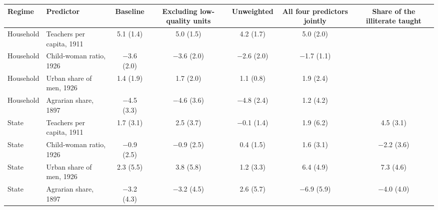 \begin{tabular}{llccccc}
\toprule
Regime & Predictor & Baseline & Excluding low-quality units & Unweighted & All four predictors jointly & Share of the illiterate taught \\
\midrule
Household & Teachers per capita, 1911 & 5.1 (1.4) & 5.0 (1.5) & 4.2 (1.7) & 5.0 (2.0) &  \\
Household & Child-woman ratio, 1926 & $-$3.6 (2.0) & $-$3.6 (2.0) & $-$2.6 (2.0) & $-$1.7 (1.1) &  \\
Household & Urban share of men, 1926 & 1.4 (1.9) & 1.7 (2.0) & 1.1 (0.8) & 1.9 (2.4) &  \\
Household & Agrarian share, 1897 & $-$4.5 (3.3) & $-$4.6 (3.6) & $-$4.8 (2.4) & 1.2 (4.2) &  \\
State & Teachers per capita, 1911 & 1.7 (3.1) & 2.5 (3.7) & $-$0.1 (1.4) & 1.9 (6.2) & 4.5 (3.1) \\
State & Child-woman ratio, 1926 & $-$0.9 (2.5) & $-$0.9 (2.5) & 0.4 (1.5) & 1.6 (3.1) & $-$2.2 (3.6) \\
State & Urban share of men, 1926 & 2.3 (5.5) & 3.8 (5.8) & 1.2 (3.3) & 6.4 (4.9) & 7.3 (4.6) \\
State & Agrarian share, 1897 & $-$3.2 (4.3) & $-$3.2 (4.5) & 2.6 (5.7) & $-$6.9 (5.9) & $-$4.0 (4.0) \\
\bottomrule
\end{tabular}
